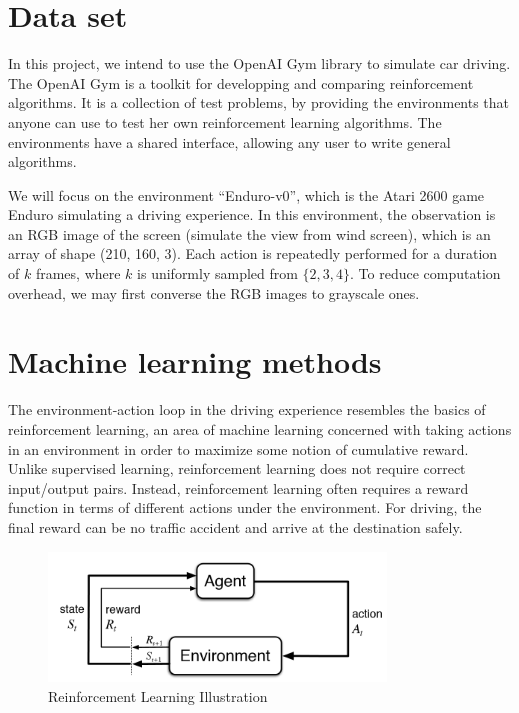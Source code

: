 \documentclass[a4paper]{article}
\begin{document}
\section{Data set}

In this project, we intend to use the OpenAI Gym library to simulate car driving.
The OpenAI Gym \cite{gym} is a toolkit for developping and comparing reinforcement algorithms.
It is a collection of test problems, by providing the environments that anyone can
use to test her own reinforcement learning algorithms. The environments have a shared
interface, allowing any user to write general algorithms.

We will focus on the environment ``Enduro-v0'', which is the Atari 2600 game Enduro
simulating a driving experience. In this environment, the observation is an RGB image
of the screen (simulate the view from wind screen), which is an array of shape (210,
160, 3). Each action is repeatedly performed for a duration of $k$ frames, where $k$
is uniformly sampled from $\{2, 3, 4\}$. To reduce computation overhead, we may first
converse the RGB images to grayscale ones.

\section{Machine learning methods}

The environment-action loop in the driving experience resembles the basics of reinforcement
learning, an area of machine learning concerned with taking actions in an environment in
order to maximize some notion of cumulative reward. Unlike supervised learning, reinforcement
learning does not require correct input/output pairs. Instead, reinforcement learning often
requires a reward function in terms of different actions under the environment. For driving,
the final reward can be no traffic accident and arrive at the destination safely.

\begin{figure}
    \centering
    \includegraphics[width=0.8\textwidth]{./figures/rl.png}
    \caption{ Reinforcement Learning Illustration}
    \label{fig:RL}
\end{figure}
\end{document}
